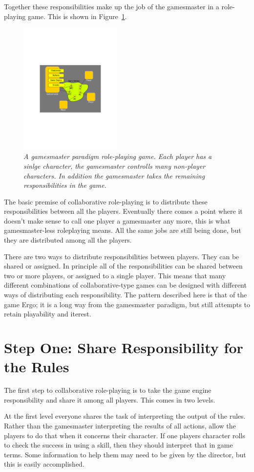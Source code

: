 \documentclass[twoside]{book}
\begin{document}
Together these responsibilities make up the job of the gamesmaster in a role-playing game. This is shown in Figure~\ref{gm-paradigm}.
\begin{figure}[h] %
\centering
\includegraphics[width=2in]{collaborate_figure1}
\caption{\it A gamesmaster paradigm role-playing game. Each player has a sinlge character, the gamesmaster controlls many non-player characters. In addition the gamesmaster takes the remaining responsibilities in the game.}
\label{gm-paradigm}
\end{figure}
The basic premise of collaborative role-playing is to distribute these responsibilities between all the players. Eventually there comes a point where it doesn't make sense to call one player a gamesmaster any more, this is what gamesmaster-less roleplaying means. All the same jobs are still being done, but they are distributed among all the players.

There are two ways to distribute responsibilities between players. They can be shared or assigned. In principle all of the responsibilities can be shared between two or more players, or assigned to a single player. This means that many different combinations of collaborative-type games can be designed with different ways of distributing each responsibility. The pattern described here is that of the game Ergo; it is a long way from the gamesmaster paradigm, but still attempts to retain playability and iterest.

\section{Step One: Share Responsibility for the Rules}

The first step to collaborative role-playing is to take the game engine responsibility and share it among all players. This comes in two levels.

At the first level everyone shares the task of interpreting the output of the rules. Rather than the gamesmaster interpreting the results of all actions, allow the players to do that when it concerns their character. If one players character rolls to check the success in using a skill, then they should interpret that in game terms. Some information to help them may need to be given by the director, but this is easily accomplished.
\end{document}
